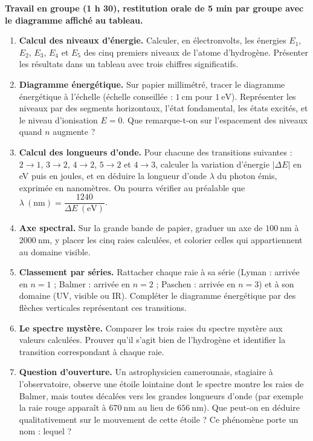 \documentclass[11pt]{article}
\begin{document}
\textbf{Travail en groupe (1 h 30), restitution orale de 5 min par groupe avec le diagramme affiché au tableau.}

\begin{enumerate}
\item \textbf{Calcul des niveaux d'énergie.} Calculer, en électronvolts, les énergies $E_1$, $E_2$, $E_3$, $E_4$ et $E_5$ des cinq premiers niveaux de l'atome d'hydrogène. Présenter les résultats dans un tableau avec trois chiffres significatifs.
\item \textbf{Diagramme énergétique.} Sur papier millimétré, tracer le diagramme énergétique à l'échelle (échelle conseillée : $1\ \mathrm{cm}$ pour $1\ \mathrm{eV}$). Représenter les niveaux par des segments horizontaux, l'état fondamental, les états excités, et le niveau d'ionisation $E = 0$. Que remarque-t-on sur l'espacement des niveaux quand $n$ augmente ?
\item \textbf{Calcul des longueurs d'onde.} Pour chacune des transitions suivantes : $2 \to 1$, $3 \to 2$, $4 \to 2$, $5 \to 2$ et $4 \to 3$, calculer la variation d'énergie $|\Delta E|$ en eV puis en joules, et en déduire la longueur d'onde $\lambda$ du photon émis, exprimée en nanomètres. On pourra vérifier au préalable que $\lambda\ (\mathrm{nm}) = \dfrac{1240}{\Delta E\ (\mathrm{eV})}$.
\item \textbf{Axe spectral.} Sur la grande bande de papier, graduer un axe de $100\ \mathrm{nm}$ à $2000\ \mathrm{nm}$, y placer les cinq raies calculées, et colorier celles qui appartiennent au domaine visible.
\item \textbf{Classement par séries.} Rattacher chaque raie à sa série (Lyman : arrivée en $n = 1$ ; Balmer : arrivée en $n = 2$ ; Paschen : arrivée en $n = 3$) et à son domaine (UV, visible ou IR). Compléter le diagramme énergétique par des flèches verticales représentant ces transitions.
\item \textbf{Le spectre mystère.} Comparer les trois raies du spectre mystère aux valeurs calculées. Prouver qu'il s'agit bien de l'hydrogène et identifier la transition correspondant à chaque raie.
\item \textbf{Question d'ouverture.} Un astrophysicien camerounais, stagiaire à l'observatoire, observe une étoile lointaine dont le spectre montre les raies de Balmer, mais toutes décalées vers les grandes longueurs d'onde (par exemple la raie rouge apparaît à $670\ \mathrm{nm}$ au lieu de $656\ \mathrm{nm}$). Que peut-on en déduire qualitativement sur le mouvement de cette étoile ? Ce phénomène porte un nom : lequel ?
\end{enumerate}
\end{document}
